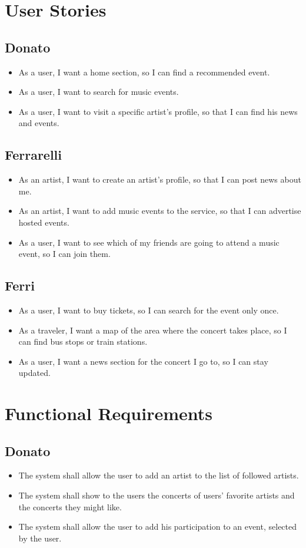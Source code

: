 \documentclass[11pt,a4paper]{article}
\begin{document}
\section{User Stories}
\subsection{Donato}
\begin{itemize}
\item As a user, I want a home section, so I can find a recommended event. 
\item As a user, I want to search for music events.
\item As a user, I want to visit a specific artist’s profile, so that I can find his news and events.
\end{itemize}
\subsection{Ferrarelli}
\begin{itemize}
\item As an artist, I want to create an artist’s profile, so that I can post news about me.
\item As an artist, I want to add music events to the service, so that I can advertise hosted events.
\item As a user, I want to see which of my friends are going to attend a music event, so I can join them.
\end{itemize}
\subsection{Ferri}
\begin{itemize}
\item As a user, I want to buy tickets, so I can search for the event only once.
\item As a traveler, I want a map of the area where the concert takes place, so I can
find bus stops or train stations. 
\item As a user, I want a news section for the concert I go to, so I can stay updated.
\end{itemize}
\section{Functional Requirements}
\subsection{Donato}
\begin{itemize}
\item The system shall allow the user to add an artist to the list of followed artists.
\item The system shall show to the users the concerts of users’ favorite artists and the concerts they might like.
\item The system shall allow the user to add his participation to an event, selected by the user.
\end{itemize}
\end{document}

